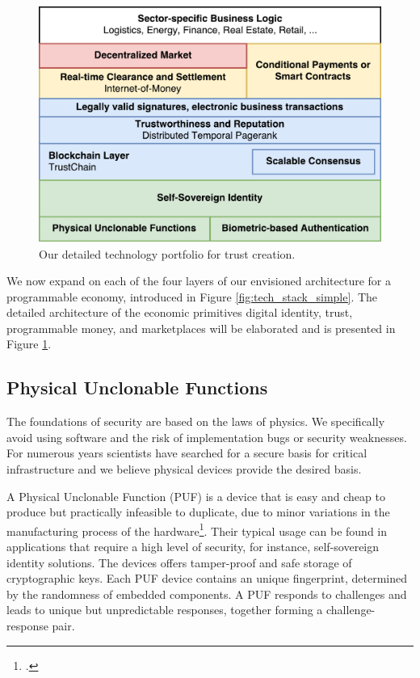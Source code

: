 \documentclass[USenglish]{article}
\begin{document}
\begin{figure}[t]
	\centering
	\includegraphics[width=1\columnwidth]{assets/tech_stack}
	\caption{Our detailed technology portfolio for trust creation.}
	\label{fig:tech_stack}
\end{figure}

We now expand on each of the four layers of our envisioned architecture for a programmable economy, introduced in Figure \ref{fig:tech_stack_simple}.
The detailed architecture of the economic primitives digital identity, trust, programmable money, and marketplaces will be elaborated and is presented in Figure \ref{fig:tech_stack}.

\subsection{Physical Unclonable Functions}
\label{sec:pufs}
The foundations of security are based on the laws of physics.
We specifically avoid using software and the risk of implementation bugs or security weaknesses.
For numerous years scientists have searched for a secure basis for critical infrastructure and we believe physical devices provide the desired basis.

A Physical Unclonable Function (PUF) is a device that is easy and cheap to produce but practically infeasible to duplicate, due to minor variations in the manufacturing process of the hardware\footcite{cortez2012modeling}.
Their typical usage can be found in applications that require a high level of security, for instance, self-sovereign identity solutions.
The devices offers tamper-proof and safe storage of cryptographic keys.
Each PUF device contains an unique fingerprint, determined by the randomness of embedded components.
A PUF responds to challenges and leads to unique but unpredictable responses, together forming a challenge-response pair.
\end{document}
